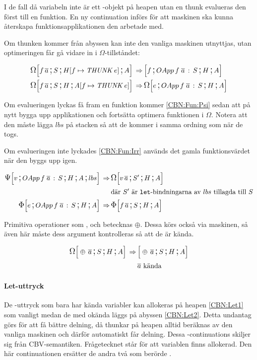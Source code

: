 \documentclass[../Optimise]{subfiles}
\begin{document}
I de fall då variabeln inte är ett -objekt på heapen utan en thunk evalueras den först
till en funktion. En ny continuation  införs för att maskinen
ska kunna återskapa funktionsapplikationen den arbetade med.

Om thunken kommer från abyssen kan inte den vanliga maskinen utnyttjas, utan optimeringen får
gå vidare in i $\Omega$-tillståndet:

\begin{align}
\CBNOMEGA S{\heap f{\THUNK e}}A{f\, \many{a}}  \rulesep & \CBNMC f{\cOApp f{\many{a}}S}HA\\
\CBNOMEGA SH{\abyss f{\THUNK e}}{f\, \many{a}}  \rulesep & \CBNOMEGA{\cOApp f{\many{a}}S}HAe
\end{align}

Om evalueringen lyckas få fram en funktion kommer \eqref{CBN:Fun:Psi} sedan att
på nytt bygga upp applikationen och fortsätta optimera funktionen i $\Omega$.
Notera att den måste lägga $lbs$ på stacken så att de kommer i samma ordning som när de togs.

Om evalueringen inte lyckades \eqref{CBN:Fun:Irr} används det gamla funktionsvärdet
när den byggs upp igen.

\begin{align}
\label{CBN:Fun:Psi}\CBNPSI{\cOApp f{\many{a}}S}HA{lbs}v  \rulesep & \CBNOMEGA {S'}HA{v\, \many{a}} \\
 & \text{där } S' \text{ är \kw{let}-bindningarna av } lbs \text{ tillagda till } S \nonumber \\
\label{CBN:Fun:Irr}\CBNIRR {\cOApp f {\many{a}}S}HAe  \rulesep & \CBNIRR SHA{f\, \many{a}}
\end{align}

Primitiva operationer som \ic{+\#}, \ic{*\#} och \ic{==\#} betecknas $\oplus$. 
Dessa körs också via maskinen, så även här måste dess argument kontrolleras så att de är kända.

\begin{align}
\CBNOMEGA SHA{\oplus\, \many{a}}  \rulesep & \CBNMC{\oplus\, \many{a}}SHA \\
 & \many{a} \text{ kända } \nonumber
\end{align}


\paragraph{Let-uttryck}
De -uttryck som bara har kända variabler kan allokeras på heapen \eqref{CBN:Let1} som vanligt
medan de med okända läggs på abyssen \eqref{CBN:Let2}.
Detta undantag görs för att få bättre delning, då thunkar på heapen alltid beräknas
av den vanliga maskinen och därför automatiskt får delning. Dessa
-continuations skiljer sig från CBV-semantiken. Frågetecknet står för
att variablen finns allokerad. Den här continuationen ersätter de andra två
som berörde .
\end{document}
